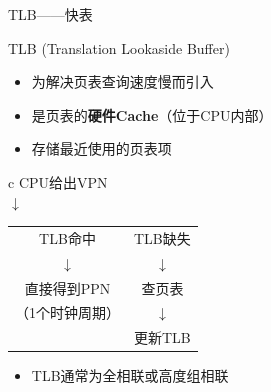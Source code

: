 \documentclass[10pt, aspectratio=169]{beamer}
\begin{document}
\begin{frame}{TLB——快表}
    \begin{block}{TLB (Translation Lookaside Buffer)}
        \begin{itemize}
            \item 为解决页表查询速度慢而引入
            \item 是页表的\textbf{硬件Cache}（位于CPU内部）
            \item 存储最近使用的页表项
        \end{itemize}
    \end{block}
    \vspace{0.3em}
    \begin{center}
        \begin{tabular}{c}
            CPU给出VPN \\
            $\downarrow$ \\
            \begin{tabular}{c|c}
                TLB命中 & TLB缺失 \\
                $\downarrow$ & $\downarrow$ \\
                直接得到PPN & 查页表 \\
                （1个时钟周期） & $\downarrow$ \\
                              & 更新TLB \\
            \end{tabular}
        \end{tabular}
    \end{center}
    \vspace{0.3em}
    \begin{itemize}
        \item TLB通常为全相联或高度组相联
    \end{itemize}
\end{frame}
\end{document}
